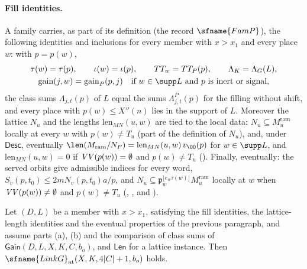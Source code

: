 \paragraph{Fill identities.}
A family carries, as part of its definition (the record $\sfname{FamP}$), the following identities and inclusions for
every member with $x>x_1$ and every place $w$: with $p=p(w)$,
\begin{gather}
\tau(w)=\tau(p),\qquad\iota(w)=\iota(p),\qquad TT_w=TT_P(p),\qquad \Lambda_K=\Lambda_G(L),\notag\\
\mathrm{gain}(j,w)=\mathrm{gain}_P(p,j)\quad\text{if }w\in\supp L\text{ and }p\text{ is inert or signal},
\label{eq:pf:linkG:fill}
\end{gather}
the class sums $\Lambda_{j,t}(p)$ of $L$ equal the sums $\Lambda^P_{j,t}(p)$ for the filling without shift, and every
place with $p(w)\le X''(n)$ lies in the support of $L$. Moreover the lattice $N_u$ and the lengths
$\mathrm{len}_{MN}(u,w)$ are tied to the local data: $N_u\subseteq M^{\mathrm{ram}}_u$ locally at every $w$ with $p(w)\ne
T_u$ (part of the definition of $N_u$), and, under $\mathsf{Desc}$, eventually
$\len(M_{\mathrm{ram}}/N_P)=\mathrm{len}_{MN}(u,w)\,v_\OO(p)$ for $w\in\supp L$, and $\mathrm{len}_{MN}(u,w)=0$ if
$\mathit{VV}(p(w))=\emptyset$ and $p(w)\ne T_u$ (). Finally, eventually: the served orbits
give admissible indices for every word, $S_v(p,t_0)\le2mN_v(p,t_0)a/p$, and $N_u\subseteq\mathfrak p_w^{\lfloor
e_w\tau(w)\rfloor}M^{\mathrm{ram}}_u$ locally at $w$ when $\mathit{VV}(p(w))\ne\emptyset$ and $p(w)\ne T_u$
(, , and ).

\begin{proposition}\label{pf:linkG:linkgatcore}
Let $(D,L)$ be a member with $x>x_1$, satisfying the fill identities, the lattice-length identities and the eventual
properties of the previous paragraph, and assume parts (a), (b) and the comparison of class sums of
$\mathsf{Gain}(D,L,X,K,C,b_o)$, and $\mathsf{Len}$ for a lattice instance. Then
$\sfname{LinkG}_{\mathrm{at}}(X,K,4|C|+1,b_o)$ holds.
\end{proposition}

